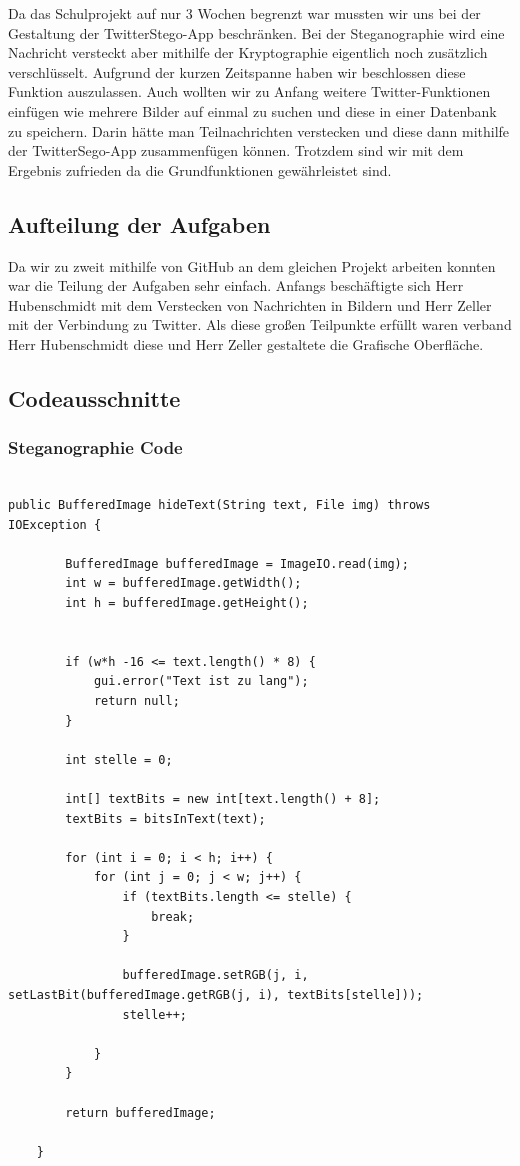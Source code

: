 \documentclass[11pt]{article}
\begin{document}
Da das Schulprojekt auf nur 3 Wochen begrenzt war mussten wir uns bei der Gestaltung der TwitterStego-App beschränken. Bei der Steganographie wird eine Nachricht versteckt aber mithilfe der Kryptographie eigentlich noch zusätzlich verschlüsselt. Aufgrund der kurzen Zeitspanne haben wir beschlossen diese Funktion auszulassen. Auch wollten wir zu Anfang weitere Twitter-Funktionen einfügen wie mehrere Bilder auf einmal zu suchen und diese in einer Datenbank zu speichern. Darin hätte man Teilnachrichten verstecken und diese dann mithilfe der TwitterSego-App zusammenfügen können. Trotzdem sind wir mit dem Ergebnis zufrieden da die Grundfunktionen gewährleistet sind.

\subsection{Aufteilung der Aufgaben}

Da wir zu zweit mithilfe von GitHub an dem gleichen Projekt arbeiten konnten war die Teilung der Aufgaben sehr einfach. Anfangs beschäftigte sich Herr Hubenschmidt mit dem Verstecken von Nachrichten in Bildern und Herr Zeller mit der Verbindung zu Twitter. Als diese großen Teilpunkte erfüllt waren verband Herr Hubenschmidt diese und Herr Zeller gestaltete die Grafische Oberfläche.

\newpage
\subsection{Codeausschnitte}

\subsubsection{Steganographie Code}
\begin{lstlisting}[frame=single]  % Start your code-block

public BufferedImage hideText(String text, File img) throws IOException {

		BufferedImage bufferedImage = ImageIO.read(img);
		int w = bufferedImage.getWidth();
		int h = bufferedImage.getHeight();


		if (w*h -16 <= text.length() * 8) {
			gui.error("Text ist zu lang");
			return null;
		}
		
		int stelle = 0;

		int[] textBits = new int[text.length() + 8];
		textBits = bitsInText(text);

		for (int i = 0; i < h; i++) {
			for (int j = 0; j < w; j++) {
				if (textBits.length <= stelle) {
					break;
				}

				bufferedImage.setRGB(j, i, setLastBit(bufferedImage.getRGB(j, i), textBits[stelle]));
				stelle++;

			}
		}

		return bufferedImage;

	}


\end{lstlisting}
\end{document}
